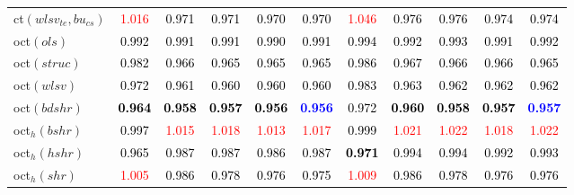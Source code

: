 \begin{tabular}[t]{l|>{}cccc>{}c|ccccc}
ct$(wlsv_{te}, bu_{cs})$ & \textcolor{red}{1.016} & \textcolor{black}{0.971} & \textcolor{black}{0.971} & \textcolor{black}{0.970} & \textcolor{black}{0.970} & \textcolor{red}{1.046} & \textcolor{black}{0.976} & \textcolor{black}{0.976} & \textcolor{black}{0.974} & \textcolor{black}{0.974}\\
oct$(ols)$ & \textcolor{black}{0.992} & \textcolor{black}{0.991} & \textcolor{black}{0.991} & \textcolor{black}{0.990} & \textcolor{black}{0.991} & \textcolor{black}{0.994} & \textcolor{black}{0.992} & \textcolor{black}{0.993} & \textcolor{black}{0.991} & \textcolor{black}{0.992}\\
oct$(struc)$ & \textcolor{black}{0.982} & \textcolor{black}{0.966} & \textcolor{black}{0.965} & \textcolor{black}{0.965} & \textcolor{black}{0.965} & \textcolor{black}{0.986} & \textcolor{black}{0.967} & \textcolor{black}{0.966} & \textcolor{black}{0.966} & \textcolor{black}{0.965}\\
oct$(wlsv)$ & \textcolor{black}{0.972} & \textcolor{black}{0.961} & \textcolor{black}{0.960} & \textcolor{black}{0.960} & \textcolor{black}{0.960} & \textcolor{black}{0.983} & \textcolor{black}{0.963} & \textcolor{black}{0.962} & \textcolor{black}{0.962} & \textcolor{black}{0.962}\\
oct$(bdshr)$ & \textcolor{black}{\textbf{0.964}} & \textcolor{black}{\textbf{0.958}} & \textcolor{black}{\textbf{0.957}} & \textcolor{black}{\textbf{0.956}} & \textcolor{blue}{\textbf{0.956}} & \textcolor{black}{0.972} & \textcolor{black}{\textbf{0.960}} & \textcolor{black}{\textbf{0.958}} & \textcolor{black}{\textbf{0.957}} & \textcolor{blue}{\textbf{0.957}}\\
oct$_h(bshr)$ & \textcolor{black}{0.997} & \textcolor{red}{1.015} & \textcolor{red}{1.018} & \textcolor{red}{1.013} & \textcolor{red}{1.017} & \textcolor{black}{0.999} & \textcolor{red}{1.021} & \textcolor{red}{1.022} & \textcolor{red}{1.018} & \textcolor{red}{1.022}\\
oct$_h(hshr)$ & \textcolor{black}{0.965} & \textcolor{black}{0.987} & \textcolor{black}{0.987} & \textcolor{black}{0.986} & \textcolor{black}{0.987} & \textcolor{black}{\textbf{0.971}} & \textcolor{black}{0.994} & \textcolor{black}{0.994} & \textcolor{black}{0.992} & \textcolor{black}{0.993}\\
oct$_h(shr)$ & \textcolor{red}{1.005} & \textcolor{black}{0.986} & \textcolor{black}{0.978} & \textcolor{black}{0.976} & \textcolor{black}{0.975} & \textcolor{red}{1.009} & \textcolor{black}{0.986} & \textcolor{black}{0.978} & \textcolor{black}{0.976} & \textcolor{black}{0.976}\\

\end{tabular}
